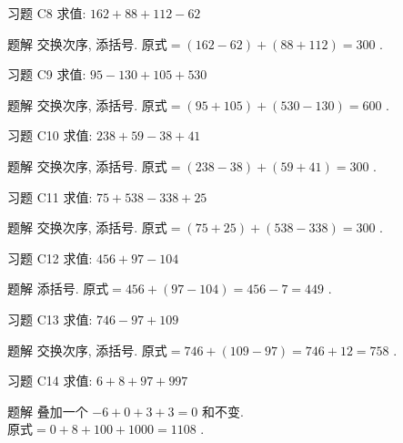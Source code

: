 \documentclass[content.tex]{subfiles}
\begin{document}
\begin{frame}{习题 C8}
求值: $162+88+112-62$
\begin{exampleblock}{题解}
交换次序, 添括号. $\text{原式} = (162-62) + (88+112) = 300$ .
\end{exampleblock}
\end{frame}

\begin{frame}{习题 C9}
求值: $95-130+105+530$
\begin{exampleblock}{题解}
交换次序, 添括号. $\text{原式} = (95+105) + (530-130) = 600$ .
\end{exampleblock}
\end{frame}

\begin{frame}{习题 C10}
求值: $238+59-38+41$
\begin{exampleblock}{题解}
交换次序, 添括号. $\text{原式} = (238-38) + (59+41) = 300$ .
\end{exampleblock}
\end{frame}

\begin{frame}{习题 C11}
求值: $75+538-338+25$
\begin{exampleblock}{题解}
交换次序, 添括号. $\text{原式} = (75+25) + (538-338) = 300$ .
\end{exampleblock}
\end{frame}

\begin{frame}{习题 C12}
求值: $456+97-104$
\begin{exampleblock}{题解}
添括号. $\text{原式} = 456+(97-104) = 456-7 = 449$ .
\end{exampleblock}
\end{frame}

\begin{frame}{习题 C13}
求值: $746-97+109$
\begin{exampleblock}{题解}
交换次序, 添括号. $\text{原式} = 746+(109-97) = 746+12 = 758$ .
\end{exampleblock}
\end{frame}

\begin{frame}{习题 C14}
求值: $6+8+97+997$
\begin{exampleblock}{题解}
叠加一个 $-6+0+3+3=0$ 和不变. \\
$\text{原式} = 0+8+100+1000 = 1108$ .
\end{exampleblock}
\end{frame}
\end{document}
